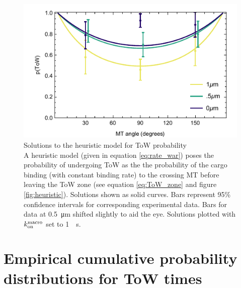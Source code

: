 \begin{figure}
\centering
\includegraphics[width=12cm]{appendix2/heuristicEXP.pdf}
\caption[Solutions to the heuristic model for ToW probability]{Solutions to the heuristic model for ToW probability \\
A heuristic model (given in equation \ref{eq:rate_war}) poses the probability of undergoing ToW as the the probability of the cargo binding (with constant binding rate) to the crossing MT before leaving the ToW zone (see equation \ref{eq:ToW_zone} and figure \ref{fig:heuristic}). 
Solutions shown as solid curves. Bars represent 95\% confidence intervals for corresponding experimental data. Bars for data at \SI{.5}{\micro\meter} shifted slightly to aid the eye. Solutions plotted with $k_\text{on}^\text{macro}$ set to \SI{1}{\per\second}.
} \label{fig:heuristicEXP}
\end{figure}

\clearpage

\chapter{Empirical cumulative probability distributions for ToW times}

